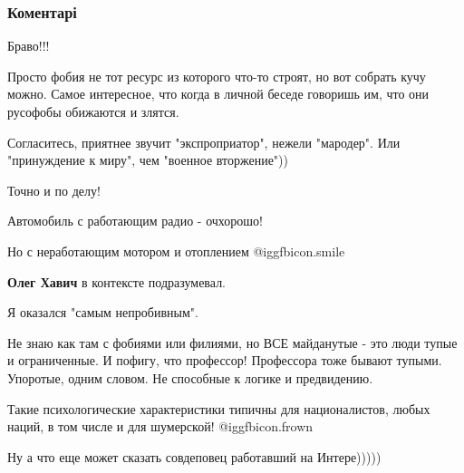  
 
 
 
 
\subsubsection{Коментарі}

\begin{itemize} %
Браво!!!


Просто фобия не тот ресурс из которого что-то строят, но вот собрать кучу
можно. Самое интересное, что когда в личной беседе говоришь им, что они
русофобы обижаются и злятся.

\begin{itemize} %
Согласитесь, приятнее звучит "экспроприатор", нежели "мародер". Или "принуждение к миру", чем "военное вторжение"))
\end{itemize} %

Точно и по делу!

Автомобиль с работающим радио - очхорошо!

\begin{itemize} %
Но с неработающим мотором и отоплением  @igg{fbicon.smile} 

\textbf{Олег Хавич} в контексте подразумевал.
\end{itemize} %


Я оказался "самым непробивным".

Не знаю как там с фобиями или филиями, но ВСЕ майданутые - это люди тупые и
ограниченные. И пофигу, что профессор! Профессора тоже бывают тупыми. Упоротые,
одним словом. Не способные к логике и предвидению.

\begin{itemize} %
Такие психологические характеристики типичны для националистов, любых наций, в том числе и для шумерской!  @igg{fbicon.frown} 

Ну а что еще может сказать совдеповец работавший на Интере)))))


\end{itemize}
\end{itemize}

